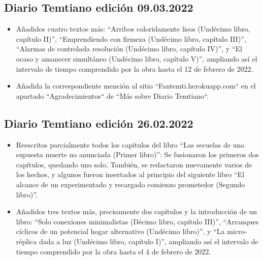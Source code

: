 \documentclass[
]{book}
\begin{document}
\hypertarget{diario-temtiano-ediciuxf3n-09.03.2022}{%
\subsection*{Diario Temtiano edición 09.03.2022}\label{diario-temtiano-ediciuxf3n-09.03.2022}}

\begin{itemize}
\item
  Añadidos cuatro textos más: ``Arribos coloridamente lisos (Undécimo libro, capítulo II)'', ``Emprendiendo con firmeza (Undécimo libro, capítulo III)'', ``Alarmas de controlada resolución (Undécimo libro, capítulo IV)'', y ``El ocaso y amanecer simultáneo (Undécimo libro, capítulo V)'', ampliando así el intervalo de tiempo comprendido por la obra hasta el 12 de febrero de 2022.
\item
  Añadida la correspondiente mención al sitio ``Fantemti.herokuapp.com`` en el apartado ``Agradecimientos`` de ``Más sobre Diario Temtiano``.
\end{itemize}

\hypertarget{diario-temtiano-ediciuxf3n-26.02.2022}{%
\subsection*{Diario Temtiano edición 26.02.2022}\label{diario-temtiano-ediciuxf3n-26.02.2022}}

\begin{itemize}
\item
  Reescritos parcialmente todos los capítulos del libro ``Las secuelas de una supuesta muerte no anunciada (Primer libro)'': Se fusionaron los primeros dos capítulos, quedando uno solo. También, se redactaron nuevamente varios de los hechos, y algunos fueron insertados al principio del siguiente libro ``El alcance de un experimentado y recargado comienzo prometedor (Segundo libro)''.
\item
  Añadidos tres textos más, precisamente dos capítulos y la introducción de un libro: ``Solo conexiones minimalistas (Décimo libro, capítulo III)'', ``Arranques cíclicos de un potencial hogar alternativo (Undécimo libro)'', y ``La micro-réplica dada a luz (Undécimo libro, capítulo I)'', ampliando así el intervalo de tiempo comprendido por la obra hasta el 4 de febrero de 2022.
\end{itemize}
\end{document}

